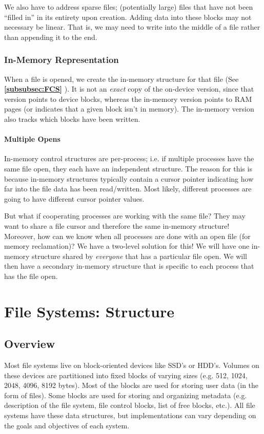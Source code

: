 \documentclass{report}
\newcommand{\refto}[2]{\textbf{\ref{#1:#2} \nameref{#1:#2}}}
\begin{document}
We also have to address sparse files; (potentially large) files that have not been ``filled in'' in
its entirety upon creation. Adding data into these blocks may not necessary be linear. That is, we
may need to write into the middle of a file rather than appending it to the end.


\subsection{In-Memory Representation}
When a file is opened, we create the in-memory structure for that file (See \refto{subsubsec}{FCS}). It
is not an \textit{exact} copy of the on-device version, since that version points to device blocks,
whereas the in-memory version points to RAM pages (or indicates that a given block isn't in
memory). The in-memory version also tracks which blocks have been written.


\subsubsection{Multiple Opens}
In-memory control structures are per-process; i.e. if multiple processes have the same file open,
they each have an independent structure. The reason for this is because in-memory structures
typically contain a cursor pointer indicating how far into the file data has been read/written. Most
likely, different processes are going to have different cursor pointer values.

But what if cooperating processes are working with the same file? They may want to share a file
cursor and therefore the same in-memory structure! Moreover, how can we know when all processes are
done with an open file (for memory reclamation)? We have a two-level solution for this! We will have
one in-memory structure shared by \textit{everyone} that has a particular file open. We will then have a
secondary in-memory structure that is specific to each process that has the file open.










\chapter{File Systems: Structure}
\section{Overview}
Most file systems live on block-oriented devices like SSD's or HDD's. Volumes on these devices are
partitioned into fixed blocks of varying sizes (e.g. 512, 1024, 2048, 4096, 8192 bytes). Most of the
blocks are used for storing user data (in the form of files). Some blocks are used for storing and
organizing metadata (e.g. description of the file system, file control blocks, list of free blocks,
etc.). All file systems have these data structures, but implementations can vary depending on the
goals and objectives of each system.
\end{document}
